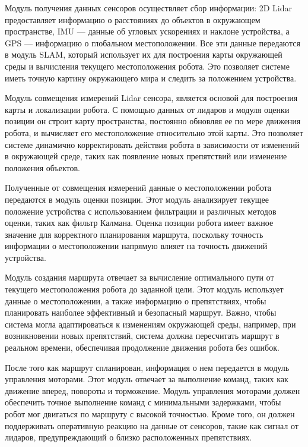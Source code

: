 Модуль получения данных сенсоров осуществляет сбор информации: 2D Lidar
предоставляет информацию о расстояниях до объектов в окружающем пространстве,
IMU — данные об угловых ускорениях и наклоне устройства, а GPS — информацию о
глобальном местоположении. Все эти данные передаются в модуль SLAM, который
использует их для построения карты окружающей среды и вычисления текущего
местоположения робота. Это позволяет системе иметь точную картину окружающего
мира и следить за положением устройства.

Модуль совмещения измерений Lidar сенсора, является основой для построения карты
и локализации робота. С помощью данных от лидаров и модуля оценки позиции он
строит карту пространства, постоянно обновляя ее по мере движения робота, и
вычисляет его местоположение относительно этой карты. Это позволяет системе
динамично корректировать действия робота в зависимости от изменений в окружающей
среде, таких как появление новых препятствий или изменение положения объектов.

Полученные от совмещения измерений данные о местоположении робота передаются в модуль оценки
позиции. Этот модуль анализирует текущее положение устройства с использованием
фильтрации и различных методов оценки, таких как фильтр Калмана. Оценка позиции
робота имеет важное значение для корректного планирования маршрута, поскольку
точность информации о местоположении напрямую влияет на точность движений
устройства.

Модуль создания маршрута отвечает за вычисление оптимального пути от текущего
местоположения робота до заданной цели. Этот модуль использует данные о
местоположении, а также информацию о препятствиях, чтобы планировать наиболее
эффективный и безопасный маршрут. Важно, чтобы система могла адаптироваться к
изменениям окружающей среды, например, при возникновении новых препятствий,
система должна пересчитать маршрут в реальном времени, обеспечивая продолжение
движения робота без ошибок.

После того как маршрут спланирован, информация о нем передается в модуль
управления моторами. Этот модуль отвечает за выполнение команд, таких как
движение вперед, повороты и торможение. Модуль управления моторами должен
обеспечить точное выполнение команд с минимальными задержками, чтобы робот мог
двигаться по маршруту с высокой точностью. Кроме того, он должен поддерживать
оперативную реакцию на данные от сенсоров, такие как сигнал от лидаров,
предупреждающий о близко расположенных препятствиях.

